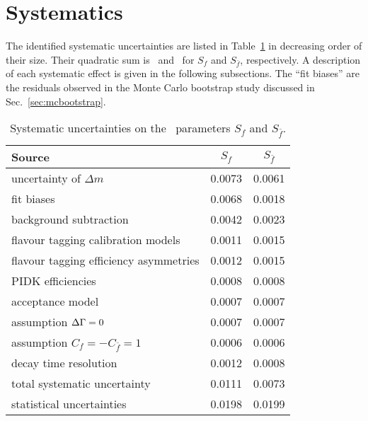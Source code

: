 \section{Systematics}
\label{sec:systematics}

The identified systematic uncertainties are listed in
Table~\ref{tab:summarySyst} in decreasing order of their size.
Their quadratic sum is \Sfsyst~and \Sfbsyst~for $S_{f}$ and $S_{\bar f}$, respectively.
A description of each systematic effect  is given in the following subsections.
The ``fit biases'' are the residuals observed in the Monte Carlo bootstrap study discussed
in Sec.~\ref{sec:mcbootstrap}.

\begin{table}[htbp]
	\centering
	\caption{Systematic uncertainties on the \CP~parameters $S_{f}$ and
	$S_{\bar f}$.}
	\begin{tabular}{lcc}
		\toprule
		Source & $S_{f}$ & $S_{\bar f}$ \\
		\midrule
		uncertainty of $\Delta m$ & \num{0.0073} & \num{0.0061} \\
        fit biases & \num{0.0068} & \num{0.0018} \\
        background subtraction  & \num{0.0042} & \num{0.0023} \\
        flavour tagging calibration models & \num{0.0011} & \num{0.0015} \\
        flavour tagging efficiency asymmetries & \num{0.0012} & \num{0.0015} \\
        PIDK efficiencies & \num{0.0008} & \num{0.0008} \\
        acceptance model & \num{0.0007} & \num{0.0007} \\
        assumption $\Delta\Gamma=0$ & \num{0.0007} & \num{0.0007} \\
        assumption $C_f=-C_{\bar f}=1$ & \num{0.0006} & \num{0.0006} \\
        decay time resolution & \num{0.0012} & \num{0.0008} \\
		\midrule
		total systematic uncertainty & 0.0111 & 0.0073 \\
		\midrule
		statistical uncertainties & 0.0198 & 0.0199 \\
		\bottomrule
	\end{tabular}
	\label{tab:summarySyst}
\end{table}

